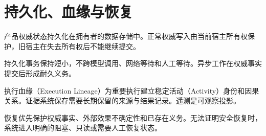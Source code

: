 \chapter{持久化、血缘与恢复}

产品权威状态持久化在拥有者的数据存储中。正常权威写入由当前宿主所有权保护，旧宿主在失去所有权后不能继续提交。

持久化事务保持短小，不跨模型调用、网络等待和人工等待。异步工作在权威事实提交后形成耐久义务。

执行血缘（Execution Lineage）为重要执行建立稳定活动（Activity）身份和因果关系。证据系统保存需要长期保留的来源与结果记录。遥测是可观察投影。

恢复优先保护权威事实、外部效果不确定性和已存在义务。无法证明安全恢复时，系统进入明确的阻塞、只读或需要人工恢复状态。
